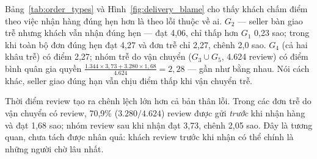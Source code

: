 Bảng~\ref{tab:order_types} và Hình~\ref{fig:delivery_blame} cho thấy khách chấm điểm theo việc nhận hàng đúng hẹn hơn là theo lỗi thuộc về ai. $G_2$ — seller bàn giao trễ nhưng khách vẫn nhận đúng hẹn — đạt 4,06, chỉ thấp hơn $G_1$ 0,23 sao; trong khi toàn bộ đơn đúng hẹn đạt 4,27 và đơn trễ chỉ 2,27, chênh 2,0 sao. $G_4$ (cả hai khâu trễ) có điểm 2,27; nhóm trễ do vận chuyển ($G_3 \cup G_5$, 4.624 review) có điểm bình quân gia quyền $\frac{1.344 \times 3{,}73 + 3.280 \times 1{,}68}{4.624} = 2{,}28$ — gần như bằng nhau. Nói cách khác, seller giao đúng hạn vẫn chịu điểm thấp khi vận chuyển trễ.

Thời điểm review tạo ra chênh lệch lớn hơn cả bản thân lỗi. Trong các đơn trễ do vận chuyển có review, 70,9\% ($3.280/4.624$) review được gửi \emph{trước} khi nhận hàng và đạt 1,68 sao; nhóm review sau khi nhận đạt 3,73, chênh 2,05 sao. Đây là tương quan, chưa tách được nhân quả: khách review trước khi nhận có thể chính là những người chờ lâu nhất.

